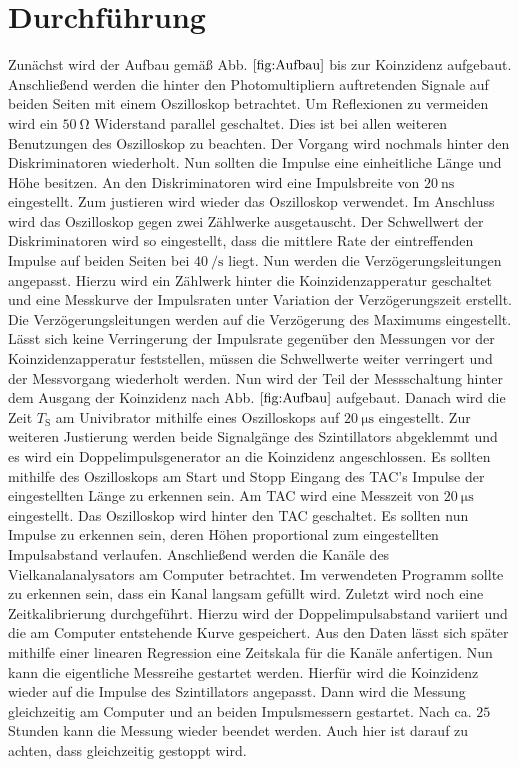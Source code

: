 
\section{Durchführung}
\label{sec:Durchführung}
Zunächst wird der Aufbau gemäß Abb. $\ref{fig:Aufbau}$ bis zur Koinzidenz aufgebaut. Anschließend werden die hinter den Photomultipliern auftretenden Signale auf beiden Seiten mit einem Oszilloskop betrachtet.
Um Reflexionen zu vermeiden wird ein $\SI{50}{\ohm}$ Widerstand parallel geschaltet. Dies ist bei allen weiteren Benutzungen des Oszilloskop zu beachten. Der Vorgang wird nochmals hinter den Diskriminatoren wiederholt. Nun sollten die Impulse eine einheitliche Länge und Höhe besitzen. An den Diskriminatoren wird eine Impulsbreite von $\SI{20}{\nano\second}$ eingestellt. Zum justieren wird wieder das Oszilloskop verwendet.
 Im Anschluss wird das Oszilloskop gegen zwei Zählwerke ausgetauscht. Der Schwellwert der Diskriminatoren wird so eingestellt, dass die mittlere Rate der eintreffenden Impulse auf beiden Seiten bei $\SI{40}{\per\second}$ liegt. Nun werden die Verzögerungsleitungen angepasst. Hierzu wird ein Zählwerk hinter die Koinzidenzapperatur geschaltet und eine Messkurve der Impulsraten unter Variation der Verzögerungszeit erstellt. Die Verzögerungsleitungen werden auf die Verzögerung des Maximums eingestellt. Lässt sich keine Verringerung der Impulsrate gegenüber den Messungen vor der Koinzidenzapperatur feststellen, müssen die Schwellwerte weiter verringert und der Messvorgang wiederholt werden. Nun wird der Teil der Messschaltung hinter dem Ausgang der Koinzidenz nach Abb. $\ref{fig:Aufbau}$ aufgebaut. Danach wird die Zeit $T_\text{S}$ am Univibrator mithilfe eines Oszilloskops auf $\SI{20}{\micro\second}$ eingestellt. Zur weiteren Justierung werden beide Signalgänge des Szintillators abgeklemmt und es wird ein Doppelimpulsgenerator an die Koinzidenz angeschlossen. Es sollten mithilfe des Oszilloskops am Start und Stopp Eingang des TAC's Impulse der eingestellten Länge zu erkennen sein. Am TAC wird eine Messzeit von $\SI{20}{\micro\second}$ eingestellt. Das Oszilloskop wird hinter den TAC geschaltet. Es sollten nun Impulse zu erkennen sein, deren Höhen proportional zum eingestellten Impulsabstand verlaufen. Anschließend werden die Kanäle des Vielkanalanalysators am Computer betrachtet. Im verwendeten Programm sollte zu erkennen sein, dass ein Kanal langsam gefüllt wird. Zuletzt wird noch eine Zeitkalibrierung durchgeführt. Hierzu wird der Doppelimpulsabstand variiert und die am Computer entstehende Kurve gespeichert. Aus den Daten lässt sich später mithilfe einer linearen Regression eine Zeitskala für die Kanäle anfertigen. Nun kann die eigentliche Messreihe gestartet werden. Hierfür wird die Koinzidenz wieder auf die Impulse des Szintillators angepasst. Dann wird die Messung gleichzeitig am Computer und an beiden Impulsmessern gestartet. Nach ca. $25$ Stunden kann die Messung wieder beendet werden. Auch hier ist darauf zu achten, dass gleichzeitig gestoppt wird.  